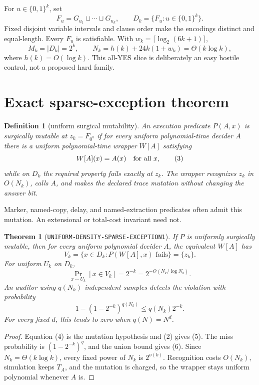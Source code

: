 \documentclass[11pt]{article}
\newtheorem{theorem}{Theorem}
\newtheorem{definition}{Definition}
\begin{document}
For \(u\in\{0,1\}^k\), set
\[
 F_u=G_{u_1}\sqcup\cdots\sqcup G_{u_k},\qquad
 D_k=\{F_u:u\in\{0,1\}^k\}.                              \tag{1}
\]
Fixed disjoint variable intervals and clause order make the encodings distinct
and equal-length. Every \(F_u\) is satisfiable. With
\(w_k=\lceil\log_2(6k+1)\rceil\),
\[
 M_k=|D_k|=2^k,\qquad
 N_k=h(k)+24k(1+w_k)=\Theta(k\log k),                     \tag{2}
\]
where \(h(k)=O(\log k)\). This all-YES slice is deliberately an easy hostile
control, not a proposed hard family.

\section{Exact sparse-exception theorem}
\begin{definition}[uniform surgical mutability]
An execution predicate \(P(A,x)\) is surgically mutable at
\(z_k=F_{0^k}\) if for every uniform polynomial-time decider \(A\) there is a
uniform polynomial-time wrapper \(W[A]\) satisfying
\[
 W[A](x)=A(x)\quad\hbox{for all }x,                       \tag{3}
\]
while on \(D_k\) the required property fails exactly at \(z_k\). The wrapper
recognizes \(z_k\) in \(O(N_k)\), calls \(A\), and makes the declared trace
mutation without changing the answer bit.
\end{definition}

Marker, named-copy, delay, and named-extraction predicates often admit this
mutation. An extensional or total-cost invariant need not.

\begin{theorem}[\texttt{UNIFORM-DENSITY-SPARSE-EXCEPTION1}]
If \(P\) is uniformly surgically mutable, then for every uniform polynomial
decider \(A\), the equivalent \(W[A]\) has
\[
 V_k=\{x\in D_k:P(W[A],x)\text{ fails}\}=\{z_k\}.         \tag{4}
\]
For uniform \(U_k\) on \(D_k\),
\[
 \Pr_{x\sim U_k}[x\in V_k]=2^{-k}
   =2^{-\Theta(N_k/\log N_k)}.                            \tag{5}
\]
An auditor using \(q(N_k)\) independent samples detects the violation with
probability
\[
 1-(1-2^{-k})^{q(N_k)}\le q(N_k)2^{-k}.                  \tag{6}
\]
For every fixed \(d\), this tends to zero when \(q(N)=N^d\).
\end{theorem}

\begin{proof}
Equation (4) is the mutation hypothesis and (2) gives (5). The miss
probability is \((1-2^{-k})^q\), and the union bound gives (6). Since
\(N_k=\Theta(k\log k)\), every fixed power of \(N_k\) is \(2^{o(k)}\).
Recognition costs \(O(N_k)\), simulation keeps \(T_A\), and the mutation is
charged, so the wrapper stays uniform polynomial whenever \(A\) is.
\end{proof}
\end{document}
